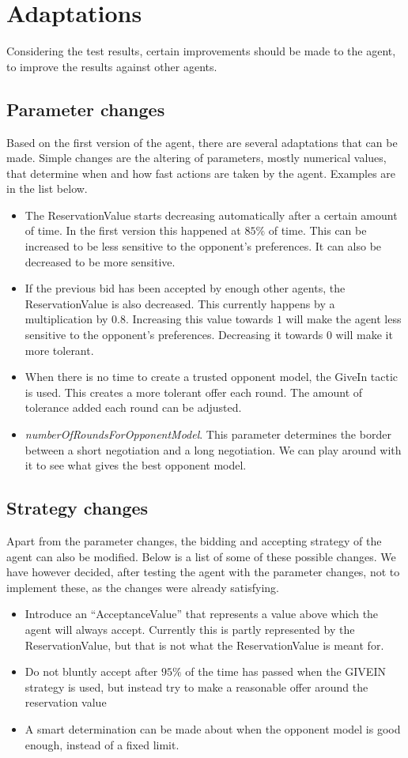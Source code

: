 \section{Adaptations}
Considering the test results, certain improvements should be made to the agent, to improve the results against other agents.

\subsection{Parameter changes}
Based on the first version of the agent, there are several adaptations that can be made. Simple changes are the altering of parameters, mostly numerical values, that determine when and how fast actions are taken by the agent. Examples are in the list below.

\begin{itemize}
\item The ReservationValue starts decreasing automatically after a certain amount of time. In the first version this happened at $85\%$ of time. This can be increased to be less sensitive to the opponent's preferences. It can also be decreased to be more sensitive.
\item If the previous bid has been accepted by enough other agents, the ReservationValue is also decreased. This currently happens by a multiplication by $0.8$. Increasing this value towards $1$ will make the agent less sensitive to the opponent's preferences. Decreasing it towards $0$ will make it more tolerant.
\item When there is no time to create a trusted opponent model, the GiveIn tactic is used. This creates a more tolerant offer each round. The amount of tolerance added each round can be adjusted.
\item \emph{numberOfRoundsForOpponentModel}. This parameter determines the border between a short negotiation and a long negotiation. We can play around with it to see what gives the best opponent model.
\end{itemize}


\subsection{Strategy changes}
Apart from the parameter changes, the bidding and accepting strategy of the agent can also be modified. Below is a list of some of these possible changes. We have however decided, after testing the agent with the parameter changes, not to implement these, as the changes were already satisfying.
 
\begin{itemize}
\item Introduce an ``AcceptanceValue'' that represents a value above which the agent will always accept. Currently this is partly represented by the ReservationValue, but that is not what the ReservationValue is meant for.
\item Do not bluntly accept after $95\%$ of the time has passed when the GIVEIN strategy is used, but instead try to make a reasonable offer around the reservation value
\item A smart determination can be made about when the opponent model is good enough, instead of a fixed limit.
\end{itemize}